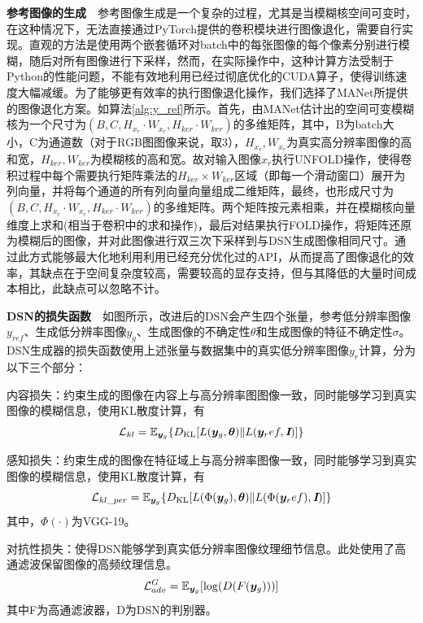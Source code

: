 \noindent\textbf{参考图像的生成}\ \ 参考图像生成是一个复杂的过程，尤其是当模糊核空间可变时，在这种情况下，无法直接通过PyTorch提供的卷积模块进行图像退化，需要自行实现。直观的方法是使用两个嵌套循环对batch中的每张图像的每个像素分别进行模糊，随后对所有图像进行下采样，然而，在实际操作中，这种计算方法受制于Python的性能问题，不能有效地利用已经过彻底优化的CUDA算子，使得训练速度大幅减缓。为了能够更有效率的执行图像退化操作，我们选择了MANet所提供的图像退化方案。如算法\ref{alg:y_ref}所示。首先，由MANet估计出的空间可变模糊核为一个尺寸为$(B,C,H_{x_r}\cdot W_{x_r},H_{ker}\cdot W_{ker})$的多维矩阵，其中，B为batch大小，C为通道数（对于RGB图图像来说，取3），$H_{x_r},W_{x_r}$为真实高分辨率图像的高和宽，$H_{ker},W_{ker}$为模糊核的高和宽。故对输入图像$x_r$执行UNFOLD操作，使得卷积过程中每个需要执行矩阵乘法的$H_{ker}\times W_{ker}$区域（即每一个滑动窗口）展开为列向量，并将每个通道的所有列向量向量组成二维矩阵，最终，也形成尺寸为$(B,C,H_{x_r}\cdot W_{x_r},H_{ker}\cdot W_{ker})$的多维矩阵。两个矩阵按元素相乘，并在模糊核向量维度上求和(相当于卷积中的求和操作)，最后对结果执行FOLD操作，将矩阵还原为模糊后的图像，并对此图像进行双三次下采样到与DSN生成图像相同尺寸。通过此方式能够最大化地利用利用已经充分优化过的API，从而提高了图像退化的效率，其缺点在于空间复杂度较高，需要较高的显存支持，但与其降低的大量时间成本相比，此缺点可以忽略不计。

\noindent\textbf{DSN的损失函数}\ \ 如图所示，改进后的DSN会产生四个张量，参考低分辨率图像$y_{ref}$、生成低分辨率图像$y_g$、生成图像的不确定性$\theta$和生成图像的特征不确定性$\sigma$。DSN生成器的损失函数使用上述张量与数据集中的真实低分辨率图像$y_r$计算，分为以下三个部分：

内容损失：约束生成的图像在内容上与高分辨率图图像一致，同时能够学习到真实图像的模糊信息，使用KL散度计算，有
\begin{equation}
    \mathcal{L}_{kl}=\mathbb{E}_{\vb*{y}_g}\{D_{\text{KL}}[L(\vb*{y}_g,\bm{\theta})\|L(\vb*{y}_ref,\textbf{\em I})]\}
\end{equation}

感知损失：约束生成的图像在特征域上与高分辨率图像一致，同时能够学习到真实图像的模糊信息，使用KL散度计算，有
\begin{equation}
    \mathcal{L}_{kl\_per}=\mathbb{E}_{\vb*{y}_g}\{D_{\text{KL}}[L(\Phi(\vb*{y}_g),\bm{\theta})\|L(\Phi(\vb*{y}_ref),\textbf{\em I})]\}
\end{equation}
其中，$\Phi(\cdot)$为VGG-19\cite{simonyan2014very}。

对抗性损失：使得DSN能够学到真实低分辨率图像纹理细节信息。此处使用了高通滤波保留图像的高频纹理信息。
\begin{equation}
    \mathcal{L}_{adv}^G=\mathbb{E}_{\vb*{y}_g}[\log(D(F(\vb*{y}_g)))]
\end{equation}
其中F为高通滤波器，D为DSN的判别器。

